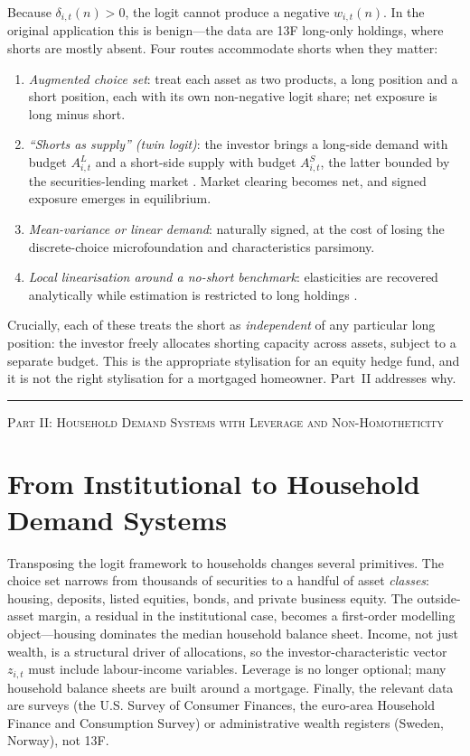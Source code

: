 \documentclass[11pt,a4paper]{article}
\begin{document}
Because $\delta_{i,t}(n) > 0$, the logit cannot produce a negative
$w_{i,t}(n)$. In the original \citet{koijen2019demand} application this
is benign---the data are 13F long-only holdings, where shorts are
mostly absent. Four routes accommodate shorts when they matter:
\begin{enumerate}
\item \emph{Augmented choice set}: treat each asset as two products, a
long position and a short position, each with its own non-negative
logit share; net exposure is long minus short.
\item \emph{``Shorts as supply'' (twin logit)}: the investor brings a
long-side demand with budget $A^L_{i,t}$ and a short-side supply with
budget $A^S_{i,t}$, the latter bounded by the securities-lending
market \citep{davolio2002market,duffie2002securities,vayanos2008search,lewellen2011institutional}.
Market clearing becomes net, and signed exposure emerges in
equilibrium.
\item \emph{Mean-variance or linear demand}: naturally signed, at the
cost of losing the discrete-choice microfoundation and characteristics
parsimony.
\item \emph{Local linearisation around a no-short benchmark}:
elasticities are recovered analytically while estimation is restricted
to long holdings \citep{haddad2025competitive}.
\end{enumerate}
Crucially, each of these treats the short as \emph{independent} of any
particular long position: the investor freely allocates
shorting capacity across assets, subject to a separate budget. This is
the appropriate stylisation for an equity hedge fund, and it is not the
right stylisation for a mortgaged homeowner. Part~II addresses why.

\bigskip
\hrule
\bigskip

\begin{center}\large\textsc{Part II: Household Demand Systems with Leverage and Non-Homotheticity}\end{center}

\section{From Institutional to Household Demand Systems}

Transposing the logit framework to households changes several primitives.
The choice set narrows from thousands of securities to a handful of
asset \emph{classes}: housing, deposits, listed equities, bonds, and
private business equity. The outside-asset margin, a residual in the
institutional case, becomes a first-order modelling object---housing
dominates the median household balance sheet. Income, not just wealth,
is a structural driver of allocations, so the investor-characteristic
vector $z_{i,t}$ must include labour-income variables. Leverage is no
longer optional; many household balance sheets are built around a
mortgage. Finally, the relevant data are surveys (the U.S. Survey of
Consumer Finances, the euro-area Household Finance and Consumption
Survey) or administrative wealth registers (Sweden, Norway), not 13F.
\end{document}
